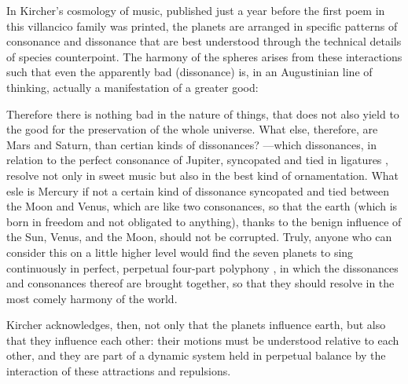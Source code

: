 In Kircher's cosmology of music, published just a year before the first poem in
this villancico family was printed, the planets are arranged in specific
patterns of consonance and dissonance that are best understood through the
technical details of species counterpoint.%
The harmony of the spheres arises from these interactions such that even the
apparently bad (dissonance) is, in an Augustinian line of thinking, actually a
manifestation of a greater good:
\begin{quoting}
	Therefore there is nothing bad in the nature of things, that does not
	also yield to the good for the preservation of the whole universe.
	What else, therefore, are Mars and Saturn, than certian kinds of
	dissonances?
	---which dissonances, in relation to the perfect consonance of Jupiter,
	syncopated and tied in ligatures , resolve not only in
	sweet music but also in the best kind of ornamentation.
	What esle is Mercury if not a certain kind of dissonance syncopated and
	tied between the Moon and Venus, which are like two consonances, so that
	the earth (which is born in freedom and not obligated to anything),
	thanks to the benign influence of the Sun, Venus, and the Moon, should
	not be corrupted.
	Truly, anyone who can consider this on a little higher level would find
	the seven planets to sing continuously in perfect, perpetual four-part
	polyphony , in which the dissonances and
	consonances thereof are brought together, so that they should resolve in
	the most comely harmony of the world.%
	\citXXX[KircherII:383--384]
\end{quoting}
Kircher acknowledges, then, not only that the planets influence earth, but also
that they influence each other: their motions must be understood relative to
each other, and they are part of a dynamic system held in perpetual balance by
the interaction of these attractions and repulsions.

